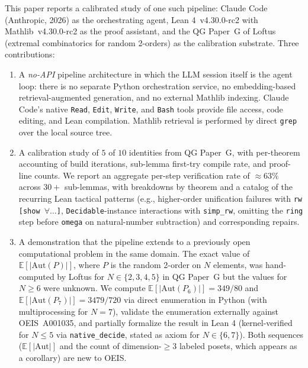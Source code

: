 \documentclass[11pt]{article}
\theoremstyle{definition}
\begin{document}
This paper reports a calibrated study of one such pipeline: Claude Code (Anthropic,
2026) as the orchestrating agent, Lean 4~v4.30.0-rc2 with Mathlib~v4.30.0-rc2 as
the proof assistant, and the QG Paper~G of Loftus~\cite{qg_paper_g} (extremal
combinatorics for random 2-orders) as the calibration substrate. Three contributions:

\begin{enumerate}
    \item A \emph{no-API} pipeline architecture in which the LLM session itself is the
    agent loop: there is no separate Python orchestration service, no embedding-based
    retrieval-augmented generation, and no external Mathlib indexing. Claude Code's
    native \texttt{Read}, \texttt{Edit}, \texttt{Write}, and \texttt{Bash} tools provide
    file access, code editing, and Lean compilation. Mathlib retrieval is performed by
    direct \texttt{grep} over the local source tree.

    \item A calibration study of $5$ of $10$ identities from QG Paper~G, with per-theorem
    accounting of build iterations, sub-lemma first-try compile rate, and proof-line
    counts. We report an aggregate per-step verification rate of $\approx 63\%$ across
    $30+$ sub-lemmas, with breakdowns by theorem and a catalog of the recurring Lean
    tactical patterns (e.g., higher-order unification failures with \texttt{rw [show
    $\forall \ldots$]}, \texttt{Decidable}-instance interactions with \texttt{simp\_rw},
    omitting the \texttt{ring} step before \texttt{omega} on natural-number subtraction)
    and corresponding repairs.

    \item A demonstration that the pipeline extends to a previously open computational
    problem in the same domain. The exact value of $\mathbb{E}[|\mathrm{Aut}(P)|]$,
    where $P$ is the random 2-order on $N$ elements, was hand-computed by Loftus for
    $N \in \{2, 3, 4, 5\}$ in QG Paper~G but the values for $N \ge 6$ were unknown.
    We compute $\mathbb{E}[|\mathrm{Aut}(P_6)|] = 349/80$ and
    $\mathbb{E}[|\mathrm{Aut}(P_7)|] = 3479/720$ via direct enumeration in Python
    (with multiprocessing for $N=7$), validate the enumeration externally against
    OEIS~A001035, and partially formalize the result in Lean 4 (kernel-verified for
    $N \le 5$ via \texttt{native\_decide}, stated as axiom for $N \in \{6, 7\}$).
    Both sequences ($\mathbb{E}[|\mathrm{Aut}|]$ and the count of dimension-$\ge 3$
    labeled posets, which appears as a corollary) are new to OEIS.
\end{enumerate}
\end{document}
